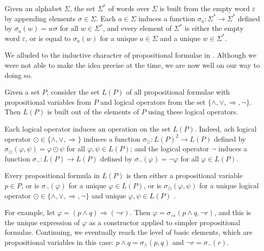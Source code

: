 \begin{example}
\label{exWordsAsInductivelyDefinedSetPreliminary}
Given an alphabet $\Sigma$, the set $\Sigma^*$ of words over $\Sigma$ is built from the empty word $\varepsilon$ by appending elements $\sigma \in \Sigma$. Each $a \in \Sigma$ induces a function $\sigma_a : \Sigma^* \to \Sigma^*$ defined by $\sigma_a(w) = w\sigma$ for all $w \in \Sigma^*$, and every element of $\Sigma^*$ is either the empty word $\varepsilon$, or is equal to $\sigma_a(w)$ for a unique $a \in \Sigma$ and a unique $w \in \Sigma^*$. 
\end{example}

We alluded to the inductive character of propositional formulae in . Although we were not able to make the idea precise at the time, we are now well on our way to doing so.

\begin{example}
\label{exPropositionalFormulaeAsInductivelyDefinedSetPreliminary}
Given a set $P$, consider the set $L(P)$ of all propositional formulae with propositional variables from $P$ and logical operators from the set $\{ {\wedge}, {\vee}, {\Rightarrow}, {\neg} \}$. Then $L(P)$ is built out of the elements of $P$ using these logical operators.

Each logical operator induces an operation on the set $L(P)$. Indeed, ach logical operator $\odot \in \{ {\wedge}, {\vee}, {\Rightarrow} \}$ induces a function $\sigma_{\odot} : L(P)^2 \to L(P)$ defined by $\sigma_{\odot}(\varphi, \psi) = \varphi \odot \psi$ for all $\varphi,\psi \in L(P)$; and the logical operator $\neg$ induces a function $\sigma_{\neg} : L(P) \to L(P)$ defined by $\sigma_{\neg}(\varphi) = \neg \varphi$ for all $\varphi \in L(P)$.

Every propositional formula in $L(P)$ is then either a propositional variable $p \in P$, or is $\sigma_{\neg}(\varphi)$ for a unique $\varphi \in L(P)$, or is $\sigma_{\odot}(\varphi,\psi)$ for a unique logical operator $\odot \in \{ {\wedge}, {\vee}, {\Rightarrow}, {\neg} \}$ and unique $\varphi,\psi \in L(P)$ .

For example, let $\varphi = (p \wedge q) \Rightarrow (\neg r)$. Then $\varphi = \sigma_{\Rightarrow}( p \wedge q, \neg r )$, and this is the unique expression of $\varphi$ as a constructor applied to simpler propositional formulae. Continuing, we eventually reach the level of basic elements, which are propositional variables in this case: $p \wedge q = \sigma_{\wedge}(p,q)$ and $\neg r = \sigma_{\neg}(r)$.
\end{example}

